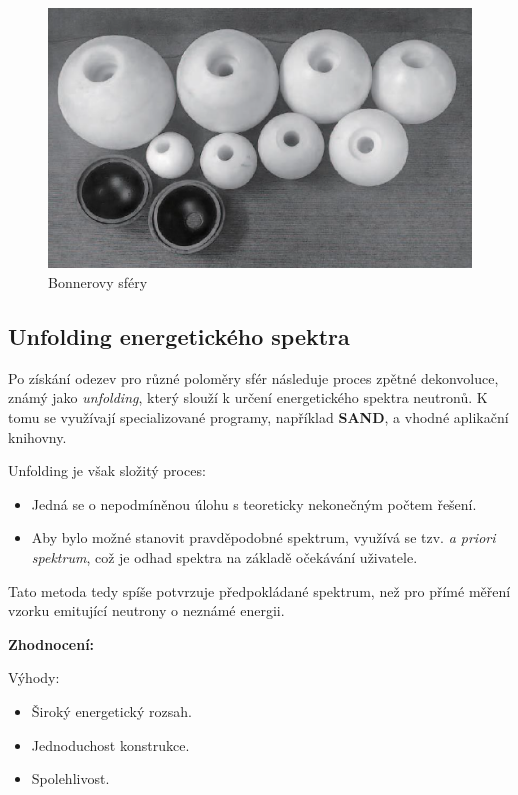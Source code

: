 \begin{figure}
    \centering
    \includegraphics[width=0.75\linewidth]{img/BonorovySféry.png}
    \caption{Bonnerovy sféry}
    \label{fig:enter-label}
\end{figure}

\subsection*{Unfolding energetického spektra}

Po získání odezev pro různé poloměry sfér následuje proces zpětné dekonvoluce, známý jako \textit{unfolding}, který slouží k určení energetického spektra neutronů. K tomu se využívají specializované programy, například \textbf{SAND}, a vhodné aplikační knihovny.

Unfolding je však složitý proces:

\begin{itemize}
    \item Jedná se o nepodmíněnou úlohu s teoreticky nekonečným počtem řešení.
    \item Aby bylo možné stanovit pravděpodobné spektrum, využívá se tzv. \textit{a priori spektrum}, což je odhad spektra na základě očekávání uživatele.
\end{itemize}

Tato metoda tedy spíše potvrzuje předpokládané spektrum, než pro přímé měření vzorku emitující neutrony o neznámé energii.

\textbf{Zhodnocení:}

Výhody:

\begin{itemize}
    \item Široký energetický rozsah.
    \item Jednoduchost konstrukce.
    \item Spolehlivost.
\end{itemize}

